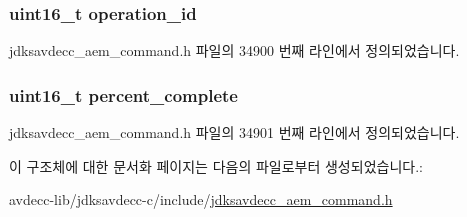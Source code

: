 \subsubsection[{\texorpdfstring{operation\+\_\+id}{operation_id}}]{\setlength{\rightskip}{0pt plus 5cm}uint16\+\_\+t operation\+\_\+id}\hypertarget{structjdksavdecc__aem__command__operation__status__response_a5b1b19c38a3b340cfc6ebcb9eeb153e2}{}\label{structjdksavdecc__aem__command__operation__status__response_a5b1b19c38a3b340cfc6ebcb9eeb153e2}


jdksavdecc\+\_\+aem\+\_\+command.\+h 파일의 34900 번째 라인에서 정의되었습니다.

\subsubsection[{\texorpdfstring{percent\+\_\+complete}{percent_complete}}]{\setlength{\rightskip}{0pt plus 5cm}uint16\+\_\+t percent\+\_\+complete}\hypertarget{structjdksavdecc__aem__command__operation__status__response_aecd19b49efe60de843635a9ab3ac6dd7}{}\label{structjdksavdecc__aem__command__operation__status__response_aecd19b49efe60de843635a9ab3ac6dd7}


jdksavdecc\+\_\+aem\+\_\+command.\+h 파일의 34901 번째 라인에서 정의되었습니다.



이 구조체에 대한 문서화 페이지는 다음의 파일로부터 생성되었습니다.\+:\begin{DoxyCompactItemize}
\item 
avdecc-\/lib/jdksavdecc-\/c/include/\hyperlink{jdksavdecc__aem__command_8h}{jdksavdecc\+\_\+aem\+\_\+command.\+h}\end{DoxyCompactItemize}
